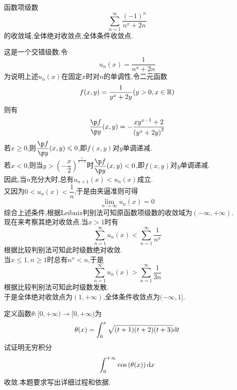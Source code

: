 \documentclass{ctexart}
\begin{document}
\begin{problem}[6.(15\songti{分})]
    函数项级数
    \[\sum_{n=1}^\infty\dfrac{(-1)^n}{n^x+2n}\]
    的收敛域,全体绝对收敛点,全体条件收敛点.
\end{problem}
\begin{solution}
    这是一个交错级数.令
    \[u_n(x)=\dfrac{1}{n^x+2n}\]
    为说明上述$u_n(x)$在固定$x$时对$n$的单调性,令二元函数
    \[f(x,y)=\dfrac{1}{y^x+2y}(y>0,x\in\mathbb{R})\]
    则有
    \[\dfrac{\p f}{\p y}(x,y)=-\dfrac{xy^{x-1}+2}{\left(y^x+2y\right)^2}\]
    若$x\geqslant0$,则$\dfrac{\p f}{\p y}(x,y)\leqslant0$,即$f(x,y)$对$y$单调递减.\\
    若$x<0$,则当$y>\left(-\dfrac x2\right)^{\frac{1}{x-1}}$时$\dfrac{\p f}{\p y}(x,y)<0$,即$f(x,y)$对$y$单调递减.\\
    因此,当$n$充分大时,总有$u_{n+1}(x)<u_{n}(x)$成立.\\
    又因为$0<u_n(x)<\dfrac{1}{n}$,于是由夹逼准则可得
    \[\lim_{n\to\infty}u_n(x)=0\]
    综合上述条件,根据Leibniz判别法可知原函数项级数的收敛域为$(-\infty,+\infty)$.\\
    现在来考察其绝对收敛点.当$x>1$时有
    \[\sum_{n=1}^{\infty}u_n(x)<\sum_{n=1}^{\infty}\dfrac{1}{n^x}\]
    根据比较判别法可知此时级数绝对收敛.\\
    当$x\leqslant 1,n\geqslant 1$时总有$n^x<n$,于是
    \[\sum_{n=1}^{\infty}u_n(x)>\sum_{n=1}^{\infty}\dfrac{1}{3n}\]
    根据比较判别法可知此时级数发散.\\
    于是全体绝对收敛点为$(1,+\infty)$,全体条件收敛点为$(-\infty,1]$.
\end{solution}
\begin{problem}[7.(15\songti{分})]
    定义函数$\theta:[0,+\infty)\to[0,+\infty)$为
    \[\theta(x)=\int_0^x\sqrt{(t+1)(t+2)(t+3)}\mathrm{d} t\]
    试证明无穷积分
    \[\int_0^{+\infty}\cos\left(\theta(x)\right)\mathrm{d} x\]
    收敛.本题要求写出详细过程和依据.

\end{problem}
\end{document}
